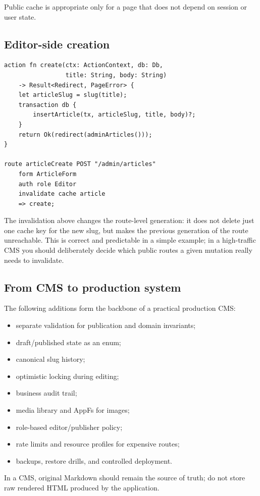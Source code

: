 Public cache is appropriate only for a page that does not depend on session or user state.

\subsection*{Editor-side creation}

\begin{lstlisting}[language=RWLang]
action fn create(ctx: ActionContext, db: Db,
                 title: String, body: String)
    -> Result<Redirect, PageError> {
    let articleSlug = slug(title);
    transaction db {
        insertArticle(tx, articleSlug, title, body)?;
    }
    return Ok(redirect(adminArticles()));
}

route articleCreate POST "/admin/articles"
    form ArticleForm
    auth role Editor
    invalidate cache article
    => create;
\end{lstlisting}

The invalidation above changes the route-level generation: it does not delete just one cache key for the new slug, but makes the previous generation of the  route unreachable. This is correct and predictable in a simple example; in a high-traffic CMS you should deliberately decide which public routes a given mutation really needs to invalidate.

\subsection*{From CMS to production system}

The following additions form the backbone of a practical production CMS:

\begin{itemize}
  \item separate validation for publication and domain invariants;
  \item draft/published state as an enum;
  \item canonical slug history;
  \item optimistic locking during editing;
  \item business audit trail;
  \item media library and AppFs for images;
  \item role-based editor/publisher policy;
  \item rate limits and resource profiles for expensive routes;
  \item backups, restore drills, and controlled deployment.
\end{itemize}

In a CMS, original Markdown should remain the source of truth; do not store raw rendered HTML produced by the application.
